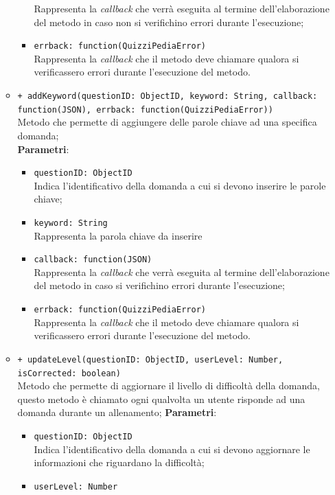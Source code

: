 \begin{itemize}
\begin{itemize}
\begin{itemize}
			Rappresenta la \textit{callback} che verrà eseguita al termine dell'elaborazione del metodo in caso non si verifichino errori durante l'esecuzione;
			\item \texttt{errback: function(QuizziPediaError)} \\
			Rappresenta la \textit{callback} che il metodo deve chiamare qualora si verificassero errori durante l'esecuzione del metodo.
		\end{itemize}
	\item \texttt{+ addKeyword(questionID: ObjectID, keyword: String, callback: function(JSON), errback: function(QuizziPediaError))} \\
	Metodo che permette di aggiungere delle parole chiave ad una specifica domanda; \\
		\textbf{Parametri}:
			 \begin{itemize}
			 	\item \texttt{questionID: ObjectID} \\
			 	Indica l'identificativo della domanda a cui si devono inserire le parole chiave;
			 	\item \texttt{keyword: String} \\
			 	Rappresenta la parola chiave da inserire
			 	\item \texttt{callback: function(JSON)} \\
			 	Rappresenta la \textit{callback} che verrà eseguita al termine dell'elaborazione del metodo in caso si verifichino errori durante l'esecuzione;
			 	\item \texttt{errback: function(QuizziPediaError)} \\
			 	Rappresenta la \textit{callback} che il metodo deve chiamare qualora si verificassero errori durante l'esecuzione del metodo.
			 \end{itemize}
	\item \texttt{+ updateLevel(questionID: ObjectID, userLevel: Number, isCorrected: boolean)} \\
	Metodo che permette di aggiornare il livello di difficoltà della domanda, questo metodo è chiamato ogni qualvolta un utente risponde ad una domanda durante un allenamento;
		\textbf{Parametri}:
			\begin{itemize}
				\item \texttt{questionID: ObjectID} \\
				Indica l'identificativo della domanda a cui si devono aggiornare le informazioni che riguardano la difficoltà;
				\item \texttt{userLevel: Number} \\

\end{itemize}
\end{itemize}
\end{itemize}
